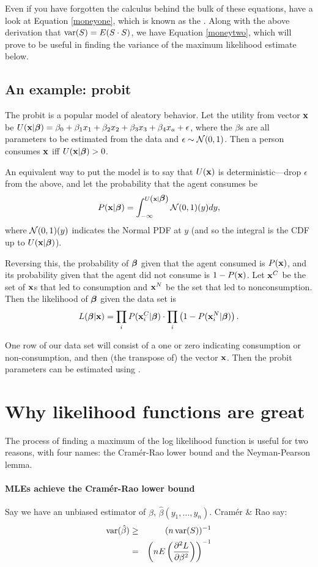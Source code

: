 Even if you have forgotten the calculus behind the bulk of these
equations, have a look at Equation \ref{moneyone}, which is known as the
.  Along with the above derivation that
$\operatorname{var}(S)=E(S\cdot S)$, we have Equation \ref{moneytwo}, which will prove
to be useful in finding the variance of the maximum likelihood estimate
below.


\subsection{An example: probit} 
The probit is a popular model of aleatory behavior. 
Let the utility from vector ${\bf x}$ be 
$U({\bf x}|{\mbox{\boldmath$\beta$}}) = \beta_0 + \beta_1 x_1 + \beta_2 x_2 + \beta_3 x_3 + \beta_4 x_a + \epsilon$,
where the $\beta$s are all parameters to be estimated from
the data and $\epsilon \sim {\cal N}(0,1)$.
Then a person consumes ${\bf x}$ iff $U({\bf x}|{\mbox{\boldmath$\beta$}})>0$. 

An equivalent way to put the model is to say that $U({\bf x})$ is
deterministic---drop $\epsilon$ from the above, and let the probability that
the agent consumes be
$$P({\bf x}|{\mbox{\boldmath$\beta$}}) = \int_{-\infty}^{U\left({\bf x}|{\mbox{\boldmath$\beta$}}\right)} {\cal N}(0,1)(y) dy,$$
where ${\cal N}(0,1)(y)$ indicates the Normal PDF at $y$ (and so the
integral is the CDF up to $U({\bf x}|{\mbox{\boldmath$\beta$}})$).

Reversing this, the probability of ${\mbox{\boldmath$\beta$}}$ given that the agent
consumed is $P({\bf x})$, and its probability given that the agent did not
consume is $1-P({\bf x})$. Let ${\bf x}^C$ be the set of ${\bf x}$s that led to
consumption and ${\bf x}^N$ be the set that led to nonconsumption. Then the
likelihood of ${\mbox{\boldmath$\beta$}}$ given the data set is 
$$L({\mbox{\boldmath$\beta$}}|{\bf x}) = \prod_{i} P({\bf x}^C_i|{\mbox{\boldmath$\beta$}}) \cdot \prod_{i} \left(1-P({\bf x}^N_i|{\mbox{\boldmath$\beta$}})\right).$$ 

One row of our data set will consist of a one or zero indicating
consumption or non-consumption, and then (the transpose of) the vector
${\bf x}$. Then the probit parameters can be estimated using
.

\section{Why likelihood functions are great} The process of finding a
maximum of the log likelihood function is 
useful for two reasons, with four names: the Cram\'er-Rao lower bound and
the Neyman-Pearson lemma.

\paragraph{MLEs achieve the Cram\'er-Rao lower bound} 
        		\label{cr} 
Say we have an unbiased estimator of $\beta$,
$\hat\beta(y_1,\dots,y_n)$. Cram\'er \& Rao say:
\begin{eqnarray}
\operatorname{var}(\hat\beta)&\geq&(n \operatorname{var}(S))^{-1}		\nonumber\\
		&=&\left(nE\left({\partial^2 L\over \partial
\beta^2}\right)\right)^{-1}			\label{CRLB}
\end{eqnarray}

